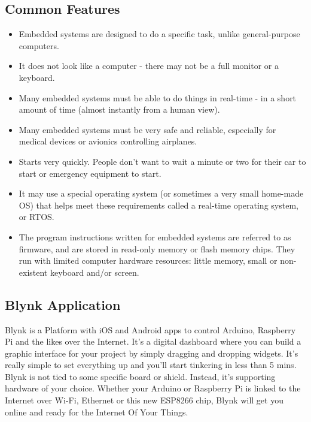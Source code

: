 \documentclass[twoside,a4paper,16pt]{book}
\begin{document}
{{\subsection*{Common Features}
\begin{itemize}
	\item Embedded systems are designed to do a specific task, unlike general-purpose computers.
	\item It does not look like a computer - there may not be a full monitor or a keyboard.
	\item Many embedded systems must be able to do things in real-time - in a short amount of time (almost instantly from a human view).
	\item Many embedded systems must be very safe and reliable, especially for medical devices or avionics controlling airplanes.
	\item Starts very quickly. People don't want to wait a minute or two for their car to start or emergency equipment to start.
	\item It may use a special operating system (or sometimes a very small home-made OS) that helps meet these requirements called a real-time operating system, or RTOS.
	\item The program instructions written for embedded systems are referred to as firmware, and are stored in read-only memory or flash memory chips. They run with limited computer hardware resources: little memory, small or non-existent keyboard and/or screen.\\	
\end{itemize}
\subsection{Blynk Application}
Blynk is a Platform with iOS and Android apps to control Arduino, Raspberry Pi and the likes over the Internet. It’s a digital dashboard where you can build a graphic interface for your project by simply dragging and dropping widgets. It’s really simple to set everything up and you’ll start tinkering in less than 5 mins. Blynk is not tied to some specific board or shield. Instead, it’s supporting hardware of your choice. Whether your Arduino or Raspberry Pi is linked to the Internet over Wi-Fi, Ethernet or this new ESP8266 chip, Blynk will get you online and ready for the Internet Of Your Things.

}}
\end{document}

